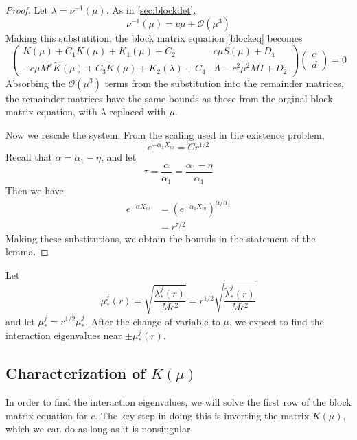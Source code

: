 \documentclass[thesis.tex]{subfiles}
\begin{document}
\begin{lemma}
\begin{proof}
Let $\lambda = \nu^{-1}(\mu)$. As in \cref{sec:blockdet},
\[
\nu^{-1}(\mu) = c \mu + \mathcal{O}(\mu^3)
\]
Making this substutition, the block matrix equation \cref{blockeq} becomes
\begin{equation*}
\begin{pmatrix}
K(\mu) + C_1 K(\mu) + K_1(\mu) + C_2 & c \mu S(\mu) + D_1 \\
-c \mu M^c \tilde{K}(\mu) + C_3 K(\mu) + K_2(\lambda) + C_4 & A - c^2 \mu^2 MI + D_2
\end{pmatrix}
\begin{pmatrix} c \\ d \end{pmatrix} = 0
\end{equation*}
Absorbing the $\mathcal{O}(\mu^3)$ terms from the substitution into the remainder matrices, the remainder matrices have the same bounds as those from the orginal block matrix equation, with $\lambda$ replaced with $\mu$. 

Now we rescale the system. From the scaling used in the existence problem,
\[
e^{-\alpha_1 X_m} = C r^{1/2} 
\]
Recall that $\alpha = \alpha_1 - \eta$, and let 
\[
\tau = \frac{\alpha}{\alpha_1} = \frac{\alpha_1 - \eta}{\alpha_1}
\]
Then we have
\begin{align*}
e^{-\alpha X_m} &= \left( e^{-\alpha_1 X_m} \right)^{\alpha/\alpha_1} \\
&= r^{\tau / 2}
\end{align*}
Making these substitutions, we obtain the bounds in the statement of the lemma.
\end{proof}
\end{lemma}

Let
\[
\mu_*^j(r) = \sqrt{\frac{\lambda_*^j(r)}{M c^2}} =  r^{1/2}
\sqrt{\frac{\tilde{\lambda}_*^j(r)}{M c^2}} 
\]
and let $\mu_*^j = r^{1/2} \tilde{\mu}_*^j$. After the change of variable to $\mu$, we expect to find the interaction eigenvalues near $\pm \mu_*^j(r)$.

\subsection{Characterization of \texorpdfstring{$K(\mu)$}{K} }

In order to find the interaction eigenvalues, we will solve the first row of the block matrix equation for $c$. The key step in doing this is inverting the matrix $K(\mu)$, which we can do as long as it is nonsingular. 
\end{document}
